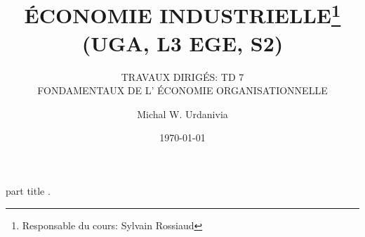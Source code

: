 
\usepackage[svgnames]{xcolor}
\usepackage{tikz}
\usetikzlibrary{shapes.geometric, arrows}
\usepackage{enumerate}   
\usepackage{multirow}
\usepackage{txfonts}
\usepackage{mathrsfs}
\usepackage{pgfplots}
\pgfplotsset{compat = newest}
\usetikzlibrary{positioning, arrows.meta}
\newcommand{\A}{(0,0) ++(135:2) circle (2)}
\newcommand{\B}{(0,0) ++(45:2) circle (2)}
\DeclareMathOperator{\C}{C}
\DeclareMathOperator{\util}{u}
%
  \usepackage{eso-pic}

{
    \begin{centering}
    \begin{beamercolorbox}[sep=11pt,center]{part title}
    \thesection.~\insertsection\par
    \end{beamercolorbox}
    \end{centering}
}
\title[]{ \textbf{ÉCONOMIE INDUSTRIELLE}\footnote{Responsable du cours: Sylvain Rossiaud}\\(\textbf{UGA, L3 EGE, S2})}
\subtitle{TRAVAUX DIRIGÉS: TD 7\\ FONDAMENTAUX DE L' ÉCONOMIE ORGANISATIONNELLE}
\date{\today}
\author{Michal W. Urdanivia\inst{*}}




